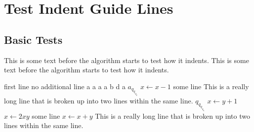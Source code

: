\documentclass[a4paper]{article}
\begin{document}
	\section{Test Indent Guide Lines}
	\subsection{Basic Tests}
	This is some text before the algorithm starts to test how it indents. This is some text before the algorithm starts to test how it indents.
	\begin{algorithmic}[1]
		\State first line
		 no additional line
		\EndIf
		\EndWhile
			\State a
			\State a
			\State a
		\EndIf
			\State a
			\State b
		\Else
			\State d
		\EndIf
			\State a
				\State $a_{q_{q_{q_q}}}$
			\EndIf
		\EndIf
		\Repeat
			\State $x \gets x - 1$
		\State some line
			\State This is a really long line that is broken up into two lines within the same line. $q_{q_{q_{q_q}}}$
		\EndProcedure
			\State $x \gets y+1$
			\Repeat
				\State $x \gets 2xy$
		\EndProcedure
		\State some line
			\State $x \gets x+y$
				\State This is a really long line that is broken up into two lines within the same line.
			\EndFor
		\EndProcedure
	\end{algorithmic}
	
	\newpage
\end{document}
